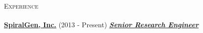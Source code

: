 \documentclass{article}
\newcommand{\lineunder}{\vspace*{-8pt} \\ \hspace*{-18pt} \hrulefill \\}
\newcommand{\header}[1]{{\hspace*{-15pt}\vspace*{6pt} \textsc{#1}} \vspace*{-6pt} \lineunder}
\newcommand{\employer}[3]{{ \textbf{#1} (#2) \underline{\textbf{\emph{#3}}}\\  }}
\begin{document}


\header{\large{Experience}}




\employer{\href{http://spiralgen.com/}{SpiralGen, Inc.}}{2013 - Present}{Senior Research Engineer}


\vspace{1mm}
\end{document}
